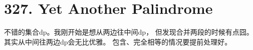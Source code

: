 \section{327. Yet Another Palindrome}
不错的集合dp。我刚开始是想从两边往中间dp，
但发现合并两段的时候有点囧。其实从中间往两边dp会无比优雅。
包含、完全相等的情况要提前处理好。
